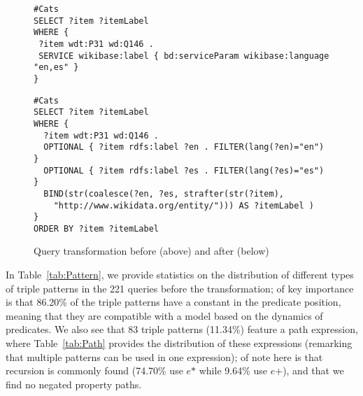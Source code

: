 \documentclass[runningheads]{llncs}
\begin{document}
\begin{figure}[!t]
\centering
{
	\begin{minipage}{0.8\textwidth}
	\begin{lstlisting}[style=sparqld]
#Cats
SELECT ?item ?itemLabel
WHERE {
 ?item wdt:P31 wd:Q146 .
 SERVICE wikibase:label { bd:serviceParam wikibase:language "en,es" }
}
	\end{lstlisting}
	\end{minipage}	
}

{
\begin{minipage}{0.8\textwidth}
	\begin{lstlisting}[style=sparqld]
#Cats
SELECT ?item ?itemLabel
WHERE {
  ?item wdt:P31 wd:Q146 .
  OPTIONAL { ?item rdfs:label ?en . FILTER(lang(?en)="en") }
  OPTIONAL { ?item rdfs:label ?es . FILTER(lang(?es)="es") }
  BIND(str(coalesce(?en, ?es, strafter(str(?item),
    "http://www.wikidata.org/entity/"))) AS ?itemLabel )
}
ORDER BY ?item ?itemLabel
	\end{lstlisting}
\end{minipage}	
}
\caption{Query transformation before (above) and after (below) \label{fig:transform}}
\end{figure}

In Table~\ref{tab:Pattern}, we provide statistics on the distribution of different types of triple patterns in the 221 queries before the transformation; of key importance is that 86.20\% of the triple patterns have a constant in the predicate position, meaning that they are compatible with a model based on the dynamics of predicates. We also see that 83 triple patterns (11.34\%) feature a path expression, where Table~\ref{tab:Path} provides the distribution of these expressions (remarking that multiple patterns can be used in one expression); of note here is that recursion is commonly found (74.70\% use $e\texttt{*}$ while 9.64\% use $e\texttt{+}$), and that we find no negated property paths.
\end{document}
